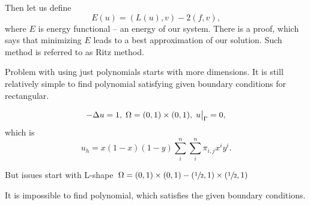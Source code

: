 Then let us define 
\begin{equation}
 E(u) = (L(u),v) - 2(f,v),
 \end{equation}
 where $E$ is energy functional -- an energy of our system. There is a proof, which says that minimizing $E$ leads to a best approximation of our solution. Such method is referred to as Ritz method. 
 
 Problem with using just polynomials starts with more dimensions. It is still relatively simple to find polynomial satisfying given boundary conditions for rectangular.
 
 \begin{center}
\end{center}
 
 
 \begin{equation}
  -\Delta u = 1 , \; \Omega = (0,1) \times (0,1), \; \restr{u}{\Gamma} = 0, 
 \end{equation}
 which is 
 \begin{equation}
  u_{h} = x(1-x)(1-y) \sum_{i}^{n} \sum_{i}^{n}\pi_{i,j}x^{i}y^{i}. 
 \end{equation}
 
 
 But issues start with L-shape $\Omega = (0,1) \times (0,1) - (\sfrac{1}{2},1) \times (\sfrac{1}{2},1) $

 
 \begin{center}
 \end{center}

 It is impossible to find polynomial, which satisfies the given boundary conditions.
 

 
